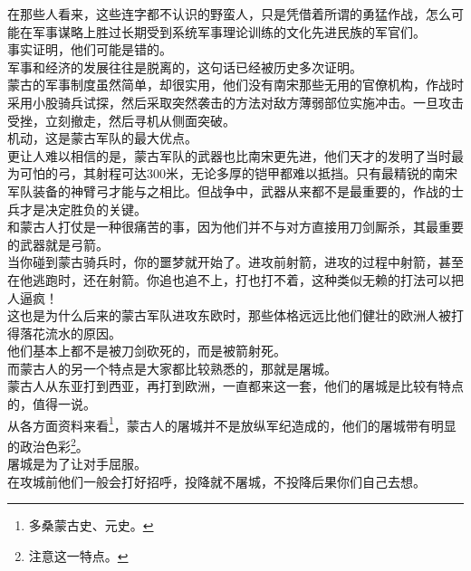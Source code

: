 \begin{multicols}{\theparacolNo}
在那些人看来，这些连字都不认识的野蛮人，只是凭借着所谓的勇猛作战，怎么可能在军事谋略上胜过长期受到系统军事理论训练的文化先进民族的军官们。\\

事实证明，他们可能是错的。\\

军事和经济的发展往往是脱离的，这句话已经被历史多次证明。\\

蒙古的军事制度虽然简单，却很实用，他们没有南宋那些无用的官僚机构，作战时采用小股骑兵试探，然后采取突然袭击的方法对敌方薄弱部位实施冲击。一旦攻击受挫，立刻撤走，然后寻机从侧面突破。\\

机动，这是蒙古军队的最大优点。\\

更让人难以相信的是，蒙古军队的武器也比南宋更先进，他们天才的发明了当时最为可怕的弓，其射程可达300米，无论多厚的铠甲都难以抵挡。只有最精锐的南宋军队装备的神臂弓才能与之相比。但战争中，武器从来都不是最重要的，作战的士兵才是决定胜负的关键。\\

和蒙古人打仗是一种很痛苦的事，因为他们并不与对方直接用刀剑厮杀，其最重要的武器就是弓箭。\\

当你碰到蒙古骑兵时，你的噩梦就开始了。进攻前射箭，进攻的过程中射箭，甚至在他逃跑时，还在射箭。你追也追不上，打也打不着，这种类似无赖的打法可以把人逼疯！\\

这也是为什么后来的蒙古军队进攻东欧时，那些体格远远比他们健壮的欧洲人被打得落花流水的原因。\\

他们基本上都不是被刀剑砍死的，而是被箭射死。\\

而蒙古人的另一个特点是大家都比较熟悉的，那就是屠城。\\

蒙古人从东亚打到西亚，再打到欧洲，一直都来这一套，他们的屠城是比较有特点的，值得一说。\\

从各方面资料来看\footnote{多桑蒙古史、元史。}，蒙古人的屠城并不是放纵军纪造成的，他们的屠城带有明显的政治色彩\footnote{注意这一特点。}。\\

屠城是为了让对手屈服。\\

在攻城前他们一般会打好招呼，投降就不屠城，不投降后果你们自己去想。\\


\end{multicols}
